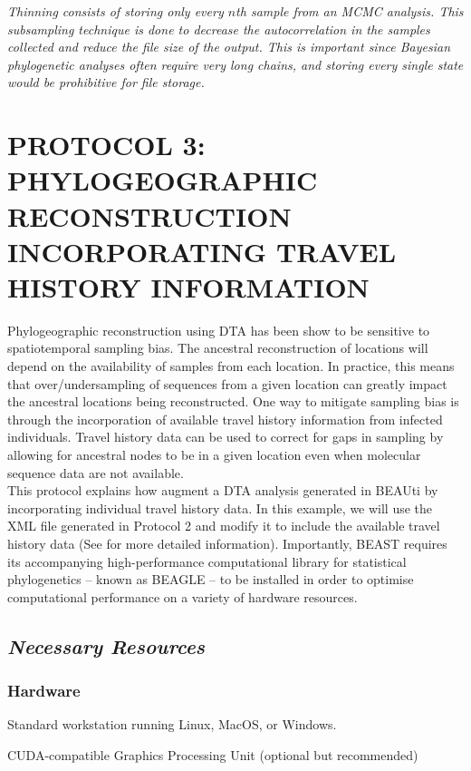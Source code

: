 \documentclass{article}
\newcommand{\ann}[1]{
\begin{adjustwidth}{0.5cm}{}
\it{#1}\\
\end{adjustwidth}}
\begin{document}
\ann{Thinning consists of storing only every $n$th sample from an MCMC analysis. This subsampling technique is done to decrease the autocorrelation in the samples collected and reduce the file size of the output. This is important since Bayesian phylogenetic analyses often require very long chains, and storing every single state would be prohibitive for file storage.}

\section*{PROTOCOL 3: PHYLOGEOGRAPHIC RECONSTRUCTION INCORPORATING TRAVEL HISTORY INFORMATION}

Phylogeographic reconstruction using DTA has been show to be sensitive to spatiotemporal sampling bias. The ancestral reconstruction of locations will depend on the availability of samples from each location. In practice, this means that over/undersampling of sequences from a given location can greatly impact the ancestral locations being reconstructed. One way to mitigate sampling bias is through the incorporation of available travel history information from infected individuals. Travel history data can be used to correct for gaps in sampling by allowing for ancestral nodes to be in a given location even when molecular sequence data are not available.\\

This protocol explains how augment a DTA analysis generated in BEAUti by incorporating individual travel history data.
In this example, we will use the XML file generated in Protocol 2 and modify it to include the available travel history data (See \cite{travhist} for more detailed information).
Importantly, BEAST requires its accompanying high-performance computational library for statistical phylogenetics -- known as BEAGLE -- %
to be installed in order to optimise computational performance on a variety of hardware resources.

\subsection*{\textbf{\textit{Necessary Resources}}}
\subsubsection*{Hardware}
\hspace{0.5cm}Standard workstation running Linux, MacOS, or Windows.

\hspace{0.5cm}CUDA-compatible Graphics Processing Unit (optional but recommended)
\end{document}
